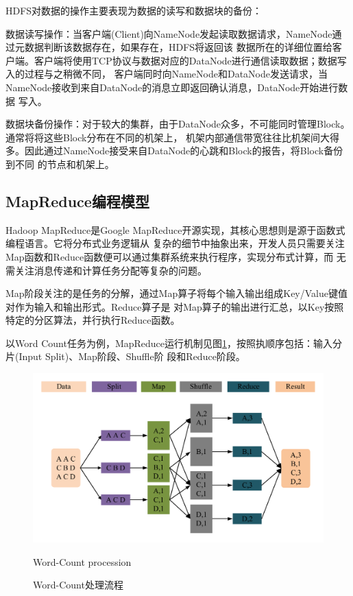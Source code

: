 HDFS对数据的操作主要表现为数据的读写和数据块的备份：

数据读写操作：当客户端(Client)向NameNode发起读取数据请求，NameNode通过元数据判断该数据存在，如果存在，HDFS将返回该
数据所在的详细位置给客户端。客户端将使用TCP协议与数据对应的DataNode进行通信读取数据；数据写入的过程与之稍微不同，
客户端同时向NameNode和DataNode发送请求，当NameNode接收到来自DataNode的消息立即返回确认消息，DataNode开始进行数据
写入。

数据块备份操作：对于较大的集群，由于DataNode众多，不可能同时管理Block。通常将将这些Block分布在不同的机架上，
机架内部通信带宽往往比机架间大得多。因此通过NameNode接受来自DataNode的心跳和Block的报告，将Block备份到不同
的节点和机架上\cite{Oriani2012From}。

\subsection{MapReduce编程模型}

Hadoop MapReduce是Google MapReduce开源实现，其核心思想则是源于函数式编程语言。它将分布式业务逻辑从
复杂的细节中抽象出来，开发人员只需要关注Map函数和Reduce函数便可以通过集群系统来执行程序，实现分布式计算，而
无需关注消息传递和计算任务分配等复杂的问题。

Map阶段关注的是任务的分解，通过Map算子将每个输入输出组成Key/Value键值对作为输入和输出形式。Reduce算子是
对Map算子的输出进行汇总，以Key按照特定的分区算法，并行执行Reduce函数。

以Word Count任务为例，MapReduce运行机制见图\ref{fig:mapreduce}，按照执顺序包括：输入分片(Input Split)、Map阶段、Shuffle阶
段和Reduce阶段\cite{SinghMapReduce}。
\begin{figure}
    \centering
    \includegraphics[width=0.8 \linewidth]{figures/mapreduce.pdf} \\
    \caption{Word-Count处理流程}{Word-Count procession}
    \label{fig:mapreduce}
\end{figure}

